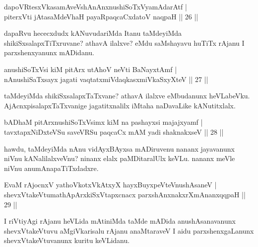 
\begin{shl}
dapoVRtesxVkasamAveVshAnAnxnushiSoTxV\s yamAdarAtf | \\
piterxVti jAtasaMdeVhaH payaRpaqcaCxdatoV naqpaH \hfill|| 26 || 
\end{shl}

\begin{artha}
dapaRvu hececxdudx kANuvudariMda Itanu taMdeyiMda shikiSxsalapxTiTxruvane? athavA ilalxve? eMdu saMshayavu huTiTx rAjanu I parxshenxyanunx mADidanu.
\end{artha}

\begin{shl}
anushiSoTxV\s si kiM pitArx utAhoV neVti BaNayxtAmf | \\
nAnushiSaTxsayx jagati vaqtatxmiVdaqkasxmiVkaSxyXteV \hfill|| 27 || 
\end{shl}

\begin{artha}
taMdeyiMda shikiSxsalapxTaTxvane? athavA ilalxve eMbudanunx heVLabeVku. AjAcnxpisalapxTaTxvanige jagatitxnalilx iMtaha naDavaLike kANutitxlalx.
\end{artha}


\begin{shl}
bADhaM pitArx\s nushiSoTxV\s simx kiM na pashayxsi majajxyamf | \\
tavxtapxNiDxteVSu saveVRSu paqcaCx mAM yadi shaknakxseV \hfill|| 28 || 
\end{shl}

\begin{artha}
hawdu, taMdeyiMda nAnu vidAyxBAyxsa mADiruvenu nananx jayavanunx niVnu 
kANalilalxveVnu? ninanx elalx paMDitaralUlx keVLu. nananx meVle niVnu 
anumAnapaTiTxdadxre.
\end{artha}

\begin{shl}
EvaM rAjocnxV yathoVkotxVkAtxyX hayxBuyxpeVteV\s nushAsaneV | \\
shevxVtakeVtumathApArxkiSxVtapxcnacx parxshAnxnakxrXmAnanxqqpaH \hfill|| 29 || 
\end{shl}

\begin{artha}
I riVtiyAgi rAjanu heVLida mAtiniMda taMde mADida anushAsanavanunx 
shevxVtakeVtuvu aMgiVkarisalu rAjanu anaMtaraveV I aidu 
parxshenxgaLanunx shevxVtakeVtuvanunx kuritu keVLidanu.
\end{artha}

